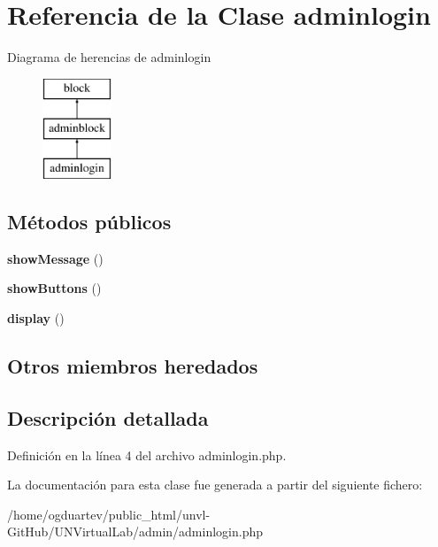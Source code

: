 \hypertarget{classadminlogin}{}\section{Referencia de la Clase adminlogin}
\label{classadminlogin}
Diagrama de herencias de adminlogin\begin{figure}[H]
\begin{center}
\leavevmode
\includegraphics[height=3.000000cm]{classadminlogin}
\end{center}
\end{figure}
\subsection*{Métodos públicos}
\begin{DoxyCompactItemize}
\item 
\mbox{\label{classadminlogin_a9413fd10c23ace3cca43c2a4919b5941}} 
{\bfseries show\+Message} ()
\item 
\mbox{\label{classadminlogin_a0b0d46370f41b7d49727d69d404f7eb3}} 
{\bfseries show\+Buttons} ()
\item 
\mbox{\label{classadminlogin_a7133dff5753a8101111b6e3d4e2d6959}} 
{\bfseries display} ()
\end{DoxyCompactItemize}
\subsection*{Otros miembros heredados}


\subsection{Descripción detallada}


Definición en la línea 4 del archivo adminlogin.\+php.



La documentación para esta clase fue generada a partir del siguiente fichero\+:\begin{DoxyCompactItemize}
\item 
/home/ogduartev/public\+\_\+html/unvl-\/\+Git\+Hub/\+U\+N\+Virtual\+Lab/admin/adminlogin.\+php\end{DoxyCompactItemize}
